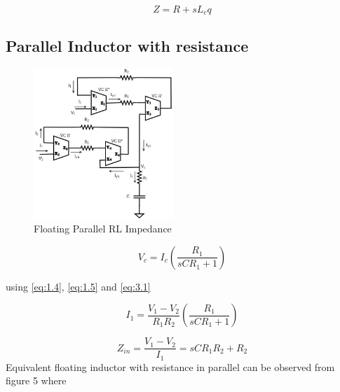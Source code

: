 \documentclass{./styles/svproc}
\begin{document}
\begin{equation}\label{eq:2.4}
{Z} = {R}+{sL_eq}
\end{equation}



\subsection{Parallel Inductor with resistance}
\begin{figure}[h]
\begin{center}
    \includegraphics[width=0.47\textwidth]{parallel.jpg}
    \caption{Floating Parallel RL Impedance}
  \end{center}
\end{figure}



\begin{equation}\label{eq:3.1}
V_c=I_c \left( \frac{R_1}{sCR_1 +1} \right)
\end{equation}

using \eqref{eq:1.4}, \eqref{eq:1.5} and \eqref{eq:3.1}

\begin{equation}\label{eq:3.2}
I_1=\frac{V_1-V_2}{R_1R_2} \left( \frac{R_1}{sCR_1 +1} \right)
\end{equation}

\begin{equation}\label{eq:3.3}
Z_{in}=\frac{V_1-V_2}{I_1} = sCR_1R_2 + R_2
\end{equation}
Equivalent floating inductor with resistance in parallel can be observed from figure 5 where
\end{document}
